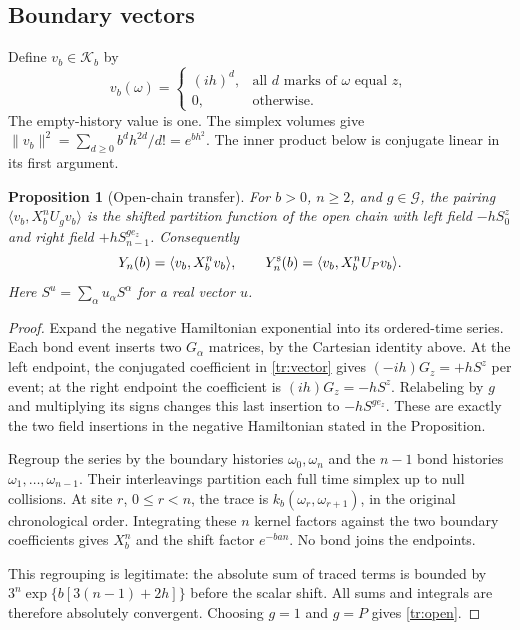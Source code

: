\documentclass[11pt]{article}
\newtheorem{proposition}[theorem]{Proposition}
\theoremstyle{remark}
\numberwithin{equation}{section}
\begin{document}
\subsection{Boundary vectors}
Define $v_b\in\mathcal K_b$ by
\begin{equation}\label{tr:vector}
 v_b(\omega)=
 \begin{cases}
 (ih)^d,&\text{all $d$ marks of $\omega$ equal $z$},\\
 0,&\text{otherwise}.
 \end{cases}
\end{equation}
The empty-history value is one. The simplex volumes give
$\lVert v_b\rVert^2=\sum_{d\ge0}b^dh^{2d}/d!=e^{bh^2}$.
The inner product below is conjugate linear in its first argument.

\begin{proposition}[Open-chain transfer]\label{tr:boundary}
For $b>0$, $n\ge2$, and $g\in\mathcal G$, the pairing
$\langle v_b,X_b^nU_gv_b\rangle$ is the shifted partition function
of the open chain with left field $-hS_0^z$ and right field
$+hS_{n-1}^{ge_z}$. Consequently
\begin{equation}\label{tr:open}
 Y_n(b)=\langle v_b,X_b^nv_b\rangle,\qquad
 Y_n^{\rm s}(b)=\langle v_b,X_b^nU_Pv_b\rangle.
\end{equation}
Here $S^u=\sum_\alpha u_\alpha S^\alpha$ for a real vector $u$.
\end{proposition}
\begin{proof}
Expand the negative Hamiltonian exponential into its ordered-time
series. Each bond event inserts two $G_\alpha$ matrices, by the
Cartesian identity above. At the left endpoint, the conjugated
coefficient in \eqref{tr:vector} gives
$(-ih)G_z=+hS^z$ per event; at the right endpoint the coefficient is
$(ih)G_z=-hS^z$. Relabeling by $g$ and multiplying its signs changes
this last insertion to $-hS^{ge_z}$. These are exactly the two field
insertions in the negative Hamiltonian stated in the Proposition.

Regroup the series by the boundary histories $\omega_0,\omega_n$
and the $n-1$ bond histories $\omega_1,\ldots,\omega_{n-1}$.
Their interleavings partition each full time simplex up to null
collisions. At site $r$, $0\le r<n$, the trace is
$k_b(\omega_r,\omega_{r+1})$, in the original chronological order.
Integrating these $n$ kernel factors against the two boundary
coefficients gives $X_b^n$ and the shift factor $e^{-ban}$.
No bond joins the endpoints.

This regrouping is legitimate: the absolute sum of traced terms is
bounded by
$3^n\exp\{b[3(n-1)+2h]\}$ before the scalar shift. All sums and
integrals are therefore absolutely convergent. Choosing $g=1$ and
$g=P$ gives \eqref{tr:open}.
\end{proof}
\end{document}
